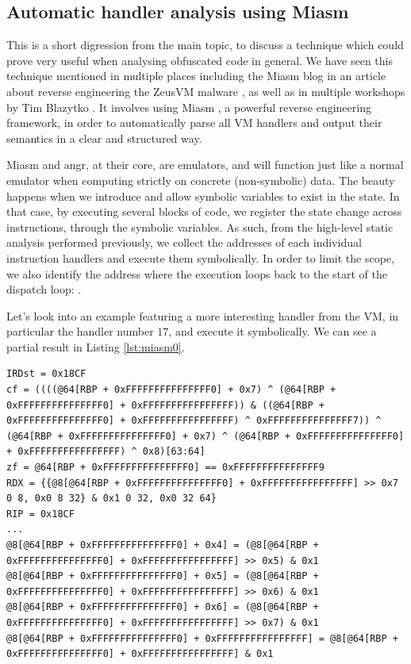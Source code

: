 \subsection{Automatic handler analysis using Miasm}
\label{sec:miasm}


This is a short digression from the main topic, to discuss a technique which could prove very useful when analysing obfuscated code in general. We have seen this technique mentioned in multiple places including the Miasm blog in an article about reverse engineering the ZeusVM malware \cite{zeusvm_miasm}, as well as in multiple workshops by Tim Blazytko \cite{tim_miasm}. It involves using Miasm \cite{miasm}, a powerful reverse engineering framework, in order to automatically parse all \gls{VM} handlers and output their semantics in a clear and structured way. 

Miasm and angr, at their core, are emulators, and will function just like a normal emulator when computing strictly on concrete (non-symbolic) data. The beauty happens when we introduce and allow symbolic variables to exist in the state. In that case, by executing several blocks of code, we register the state change across instructions, through the symbolic variables. As such, from the high-level static analysis performed previously, we collect the addresses of each individual instruction handlers and execute them symbolically. In order to limit the scope, we also identify the address where the execution loops back to the start of the dispatch loop: . 

Let's look into an example featuring a more interesting handler from the  \gls{VM}, in particular the handler number $17$, and execute it symbolically. We can see a partial result in Listing \ref{lst:miasm0}. 

\begin{lstlisting}[label={lst:miasm0}, caption={Partial result of symbolically executing a function handler in Miasm. One will notice the state change in core registers such as \cc{RDX}, flag changes, as well as changes in memory.}]
IRDst = 0x18CF
cf = ((((@64[RBP + 0xFFFFFFFFFFFFFFF0] + 0x7) ^ (@64[RBP + 0xFFFFFFFFFFFFFFF0] + 0xFFFFFFFFFFFFFFFF)) & ((@64[RBP + 0xFFFFFFFFFFFFFFF0] + 0xFFFFFFFFFFFFFFFF) ^ 0xFFFFFFFFFFFFFFF7)) ^ (@64[RBP + 0xFFFFFFFFFFFFFFF0] + 0x7) ^ (@64[RBP + 0xFFFFFFFFFFFFFFF0] + 0xFFFFFFFFFFFFFFFF) ^ 0x8)[63:64]
zf = @64[RBP + 0xFFFFFFFFFFFFFFF0] == 0xFFFFFFFFFFFFFFF9
RDX = {{@8[@64[RBP + 0xFFFFFFFFFFFFFFF0] + 0xFFFFFFFFFFFFFFFF] >> 0x7 0 8, 0x0 8 32} & 0x1 0 32, 0x0 32 64}
RIP = 0x18CF
...
@8[@64[RBP + 0xFFFFFFFFFFFFFFF0] + 0x4] = (@8[@64[RBP + 0xFFFFFFFFFFFFFFF0] + 0xFFFFFFFFFFFFFFFF] >> 0x5) & 0x1
@8[@64[RBP + 0xFFFFFFFFFFFFFFF0] + 0x5] = (@8[@64[RBP + 0xFFFFFFFFFFFFFFF0] + 0xFFFFFFFFFFFFFFFF] >> 0x6) & 0x1
@8[@64[RBP + 0xFFFFFFFFFFFFFFF0] + 0x6] = (@8[@64[RBP + 0xFFFFFFFFFFFFFFF0] + 0xFFFFFFFFFFFFFFFF] >> 0x7) & 0x1
@8[@64[RBP + 0xFFFFFFFFFFFFFFF0] + 0xFFFFFFFFFFFFFFFF] = @8[@64[RBP + 0xFFFFFFFFFFFFFFF0] + 0xFFFFFFFFFFFFFFFF] & 0x1
\end{lstlisting}

